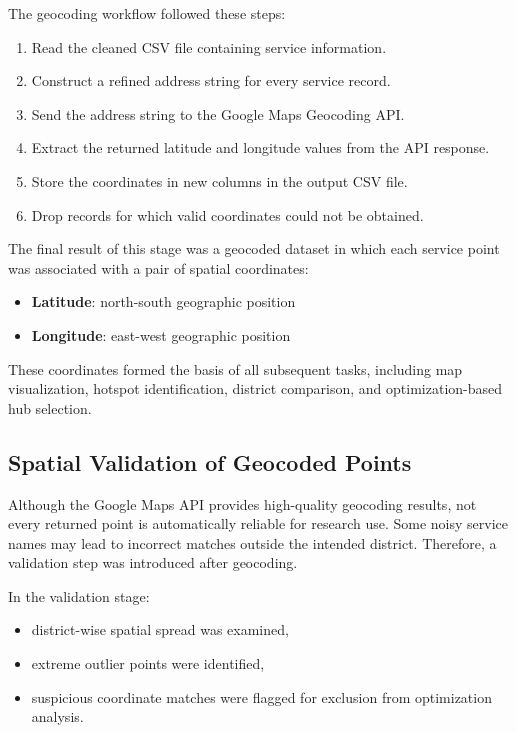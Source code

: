 The geocoding workflow followed these steps:
\begin{enumerate}
    \item Read the cleaned CSV file containing service information.
    \item Construct a refined address string for every service record.
    \item Send the address string to the Google Maps Geocoding API.
    \item Extract the returned latitude and longitude values from the API response.
    \item Store the coordinates in new columns in the output CSV file.
    \item Drop records for which valid coordinates could not be obtained.
\end{enumerate}

The final result of this stage was a geocoded dataset in which each service point was associated with a pair of spatial coordinates:
\begin{itemize}
    \item \textbf{Latitude}: north-south geographic position
    \item \textbf{Longitude}: east-west geographic position
\end{itemize}

These coordinates formed the basis of all subsequent tasks, including map visualization, hotspot identification, district comparison, and optimization-based hub selection.

\subsection{Spatial Validation of Geocoded Points}

Although the Google Maps API provides high-quality geocoding results, not every returned point is automatically reliable for research use. Some noisy service names may lead to incorrect matches outside the intended district. Therefore, a validation step was introduced after geocoding.

In the validation stage:
\begin{itemize}
    \item district-wise spatial spread was examined,
    \item extreme outlier points were identified,
    \item suspicious coordinate matches were flagged for exclusion from optimization analysis.
\end{itemize}

